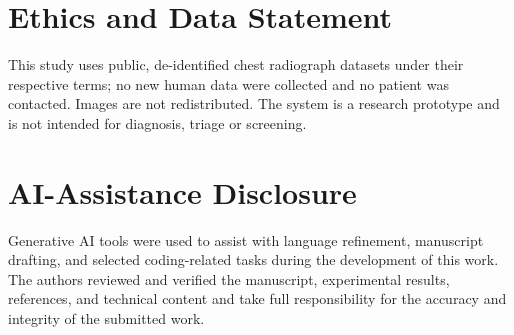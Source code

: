 \documentclass[conference]{IEEEtran}
\begin{document}
\section*{Ethics and Data Statement}
This study uses public, de-identified chest radiograph datasets under their respective terms; no new
human data were collected and no patient was contacted. Images are not redistributed. The system is a
research prototype and is not intended for diagnosis, triage or screening.

\section*{AI-Assistance Disclosure}
Generative AI tools were used to assist with language refinement, manuscript drafting, and selected
coding-related tasks during the development of this work. The authors reviewed and verified the
manuscript, experimental results, references, and technical content and take full responsibility for
the accuracy and integrity of the submitted work.



\end{document}

